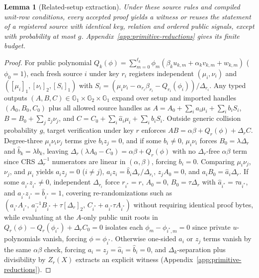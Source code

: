 \documentclass[conference,compsoc]{IEEEtran}
\theoremstyle{definition}
\numberwithin{equation}{section}
\numberwithin{table}{section}
\numberwithin{figure}{section}
\theoremstyle{plain}
\newtheorem{lemma}{Lemma}[section]
\newtheorem{lemma}{Lemma}
\begin{document}
\begin{lemma}[Related-setup extraction]
\label{lem:related-crs-extraction}
Under these source rules and compiled unit-row conditions, every accepted proof yields a witness or reuses the
statement of a registered source with identical key, relation and ordered public signals,
except with probability at most \(g\).
Appendix~\ref{app:primitive-reductions} gives its finite budget.
\end{lemma}
\begin{proof}
For public polynomial \(Q_k(\phi)=\sum_{m=0}^{\ell_k}\phi_m(\beta_k u_{k,m}+\alpha_k v_{k,m}+w_{k,m})\) (\(\phi_0=1\)), each fresh source \(i\) under key \(r_i\) registers independent \((\mu_i,\nu_i)\) and \(([\mu_i]_1,[\nu_i]_2,[S_i]_1)\) with \(S_i=(\mu_i\nu_i-\alpha_{r_i}\beta_{r_i}-Q_{r_i}(\phi_i))/\Delta_{r_i}\). Any typed outputs \((A,B,C)\in\mathbb G_1\times\mathbb G_2\times\mathbb G_1\) expand over setup and imported handles \((A_0,B_0,C_0)\) plus all allowed source handles as \(A=A_0+\sum_i a_i\mu_i+\sum_i b_i S_i\), \(B=B_0+\sum_j z_j\nu_j\), and \(C=C_0+\sum_i \hat a_i\mu_i+\sum_i \hat b_i S_i\). Outside generic collision probability \(g\), target verification under key \(r\) enforces \(AB=\alpha\beta+Q_r(\phi)+\Delta_r C\). Degree-three \(\mu_i\nu_i\nu_j\) terms give \(b_i z_j=0\), and if some \(b_i\neq 0\), \(\mu_i\nu_i\) forces \(B_0=\lambda\Delta_r\) and \(\hat b_k=\lambda b_k\), leaving \(\Delta_r(\lambda A_0-C_0)=\alpha\beta+Q_r(\phi)\) with no \(\Delta_r\)-free \(\alpha\beta\) term since CRS \(\Delta_r^{-1}\) numerators are linear in \((\alpha,\beta)\), forcing \(b_i=0\). Comparing \(\mu_i\nu_j\), \(\nu_j\), and \(\mu_i\) yields \(a_i z_j=0\) (\(i\neq j\)), \(a_i z_i=\hat b_i\Delta_r/\Delta_{r_i}\), \(z_j A_0=0\), and \(a_i B_0=\hat a_i\Delta_r\). If some \(a_{i^*}z_{i^*}\neq 0\), independent \(\Delta_{r_i}\) force \(r_{i^*}=r\), \(A_0=0\), \(B_0=\tau\Delta_r\) with \(\hat a_{i^*}=\tau a_{i^*}\), and \(a_{i^*}z_{i^*}=\hat b_{i^*}=1\), covering re-randomizations such as \((a_{i^*}A_{i^*},\,a_{i^*}^{-1}B_{i^*}+\tau[\Delta_r]_2,\,C_{i^*}+a_{i^*}\tau A_{i^*})\) without requiring identical proof bytes, while evaluating at the \(A\)-only public unit roots in \(Q_r(\phi)-Q_r(\phi_{i^*})+\Delta_r C_0=0\) isolates each \(\phi_m-\phi_{i^*,m}=0\) since private \(u\)-polynomials vanish, forcing \(\phi=\phi_{i^*}\). Otherwise one-sided \(a_i\) or \(z_j\) terms vanish by the same \(\alpha\beta\) check, forcing \(a_i=z_j=\hat a_i=\hat b_i=0\), and \(\Delta_k\)-separation plus divisibility by \(Z_r(X)\) extracts an explicit witness (Appendix~\ref{app:primitive-reductions}).
\end{proof}
\end{document}
